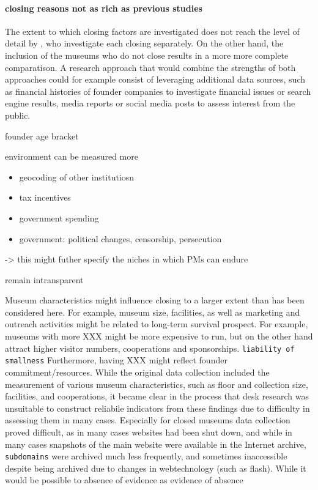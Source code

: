 \documentclass[12pt]{article}
\begin{document}
\paragraph*{closing reasons not as rich as previous studies}

The extent to which closing factors are investigated does not reach the level of detail by \cite{Velthuis_Gera_2024_fragility}, who investigate each closing separately.
On the other hand, the inclusion of the museums who do not close results in a more more complete comparatison. 
A research approach that would combine the strengths of both approaches could for example consist of leveraging additional data sources, such as financial histories of founder companies to investigate financial issues or search engine results, media reports or social media posts to assess interest from the public. 

founder age bracket


environment can be measured more
\begin{itemize}
\item geocoding of other institutiosn
\item tax incentives
\item government spending
\item government: political changes, censorship, persecution
\end{itemize}
-> this might futher specify the niches in which PMs can endure


remain intransparent



Museum characteristics might influence closing to a larger extent than has been considered here.
For example, museum size, facilities, as well as marketing and outreach activities might be related to long-term survival prospect.
For example, museums with more XXX might be more expensive to run, but on the other hand attract higher visitor numbers, cooperations and sponsorships. \texttt{liability of smallness}
Furthermore, having XXX might reflect founder commitment/resources.
While the original data collection included the measurement of various museum characteristics, such as floor and collection size, facilities, and cooperations, it became clear in the process that desk research was unsuitable to construct reliabile indicators from these findings due to difficulty in assessing them in many cases.
Especially for closed museums data collection proved difficult, as in many cases websites had been shut down, and while in many cases snapshots of the main website were available in the Internet archive, \texttt{subdomains} were archived much less frequently, and sometimes inaccessible despite being archived due to changes in webtechnology (such as flash).
While it would be possible to
absence of evidence as evidence of absence
\end{document}
